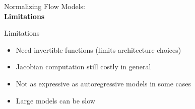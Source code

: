 \begin{frame}[allowframebreaks]{}
    \LARGE Normalizing Flow Models: \\[1.5ex] \textbf{Limitations}
\end{frame}

\begin{frame}{Limitations}
    \begin{itemize}
        \item Need invertible functions (limits architecture choices)
        \item Jacobian computation still costly in general
        \item Not as expressive as autoregressive models in some cases
        \item Large models can be slow
    \end{itemize}
\end{frame}